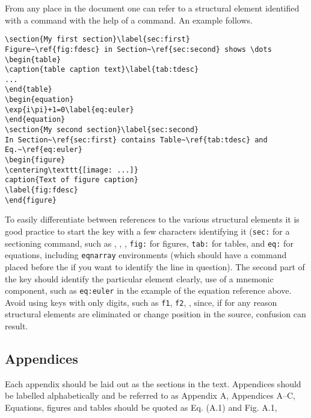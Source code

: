 \documentclass[12pt,twoside,a4paper]{cernrep}
\begin{document}
From any place in the document one can refer to a structural element
identified with a  command with the help of a 
command. An example follows.

\begin{verbatim}
\section{My first section}\label{sec:first}
Figure~\ref{fig:fdesc} in Section~\ref{sec:second} shows \dots
\begin{table}
\caption{table caption text}\label{tab:tdesc}
...
\end{table}
\begin{equation}
\exp{i\pi}+1=0\label{eq:euler}
\end{equation}
\section{My second section}\label{sec:second}
In Section~\ref{sec:first} contains Table~\ref{tab:tdesc} and
Eq.~\ref{eq:euler}
\begin{figure}
\centering\texttt{[image: ...]}
caption{Text of figure caption}
\label{fig:fdesc}
\end{figure}
\end{verbatim}
To easily differentiate between references to the various structural
elements it is good practice to start the key with a few characters
identifying it (\eg \texttt{sec:} for a sectioning command, such as
, , \etc, \texttt{fig:} for figures,
\texttt{tab:} for tables, and \texttt{eq:} for equations, including
\texttt{eqnarray} environments (which should have a 
command placed before the \Lcs{\bs} if you want to identify the line
in question). The second part of the key should identify the
particular element clearly, \eg use of a mnemonic component, such as
\texttt{eq:euler} in the example of the equation reference
above. Avoid using keys with only digits, such as \texttt{f1},
\texttt{f2}, \etc, since, if for any reason structural elements are
eliminated or change position in the source, confusion can result.

\subsection{Appendices}

Each appendix should be laid out as the sections in the text.
Appendices should be labelled alphabetically and be referred to as
Appendix A, Appendices A--C, \etc Equations, figures and tables should
be quoted as Eq. (A.1) and Fig. A.1, \etc
\end{document}
